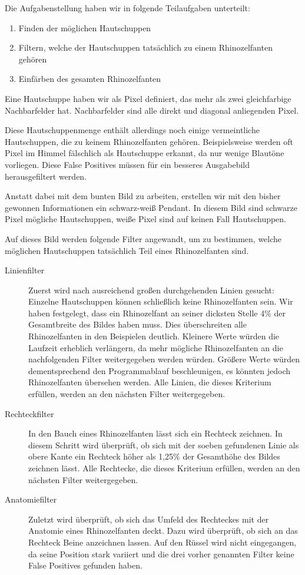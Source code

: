Die Aufgabenstellung haben wir in folgende Teilaufgaben unterteilt:
\begin{enumerate}
	\item Finden der möglichen Hautschuppen
	\item Filtern, welche der Hautschuppen tatsächlich zu einem Rhinozelfanten gehören
	\item Einfärben des gesamten Rhinozelfanten
\end{enumerate}

Eine Hautschuppe haben wir als Pixel definiert, das mehr als zwei gleichfarbige Nachbarfelder hat. Nachbarfelder sind alle direkt und diagonal anliegenden Pixel.

Diese Hautschuppenmenge enthält allerdings noch einige vermeintliche Hautschuppen, die zu keinem Rhinozelfanten gehören. Beispielsweise werden oft Pixel im Himmel fälschlich als Hautschuppe erkannt, da nur wenige Blautöne vorliegen. Diese False Positives müssen für ein besseres Ausgabebild herausgefiltert werden.

Anstatt dabei mit dem bunten Bild zu arbeiten, erstellen wir mit den bisher gewonnen Informationen ein schwarz-weiß Pendant. In diesem Bild sind schwarze Pixel mögliche Hautschuppen, weiße Pixel sind auf keinen Fall Hautschuppen.

Auf dieses Bild werden folgende Filter angewandt, um zu bestimmen, welche möglichen Hautschuppen tatsächlich Teil eines Rhinozelfanten sind.

\begin{description}
	\item[Linienfilter] Zuerst wird nach ausreichend großen durchgehenden Linien gesucht: Einzelne Hautschuppen können schließlich keine Rhinozelfanten sein. Wir haben festgelegt, dass ein Rhinozelfant an seiner dicksten Stelle 4\% der Gesamtbreite des Bildes haben muss. Dies überschreiten alle Rhinozelfanten in den Beispielen deutlich. Kleinere Werte würden die Laufzeit erheblich verlängern, da mehr mögliche Rhinozelfanten an die nachfolgenden Filter weitergegeben werden würden. Größere Werte würden dementsprechend den Programmablauf beschleunigen, es könnten jedoch Rhinozelfanten übersehen werden. Alle Linien, die dieses Kriterium erfüllen, werden an den nächsten Filter weitergegeben.
	\item[Rechteckfilter] In den Bauch eines Rhinozelfanten lässt sich ein Rechteck zeichnen. In diesem Schritt wird überprüft, ob sich mit der soeben gefundenen Linie als obere Kante ein Rechteck höher als 1,25\% der Gesamthöhe des Bildes zeichnen lässt. Alle Rechtecke, die dieses Kriterium erfüllen, werden an den nächsten Filter weitergegeben.
	\item[Anatomiefilter] Zuletzt wird überprüft, ob sich das Umfeld des Rechteckes mit der Anatomie eines Rhinozelfanten deckt. Dazu wird überprüft, ob sich an das Rechteck Beine anzeichnen lassen. Auf den Rüssel wird nicht eingegangen, da seine Position stark variiert und die drei vorher genannten Filter keine False Positives gefunden haben.
\end{description}


